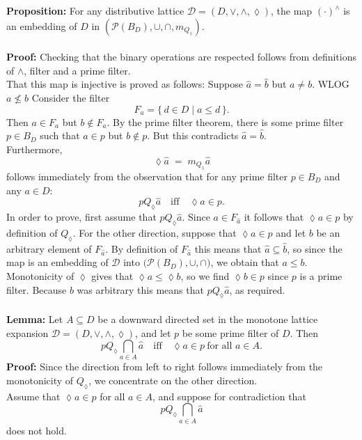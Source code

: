 \documentclass[12pt]{article}
\begin{document}
\textbf{Proposition:} For any distributive lattice $\mathcal{D}=(D, \vee, \wedge, \lozenge)$, the map $(\cdot)^{\wedge}$ is an embedding of $D$ in 
$(\mathcal{P}(B_D), \cup, \cap,m_{Q_{\lozenge}})$. \\ \\
\textbf{Proof:} Checking that the binary operations are respected follows from definitions of $\wedge$, filter and a prime filter. \\
That this map is injective is proved as follows:  
Suppose $\widehat{a} = \widehat{b}$ but $a \neq b$. WLOG $a \nleq b$
Consider the filter 
\[
F_{a} = \{\, d \in D \mid a \leq d \,\}.
\]
Then $a \in F_{a}$ but $b \notin F_{a}$.  
By the prime filter theorem, there is some prime filter $p \in B_{D}$ such that  
$a \in p$ but $b \notin p$.  
But this contradicts $\widehat{a} = \widehat{b}$. \\
Furthermore, 
\[
\lozenge \widehat{a} \;=\; m_{Q_{\lozenge}} \widehat{a}
\]
follows immediately from the observation that for any prime filter $p \in B_{D}$ and any $a \in D$:  
\[
p Q_{\lozenge} \widehat{a} \quad \text{iff} \quad \lozenge a \in p.
\]
In order to prove, first assume that $p Q_{\lozenge} \widehat{a}$.  
Since $a \in F_{\widehat{a}}$ it follows that $\lozenge a \in p$ by definition of $Q_{\lozenge}$. For the other direction, suppose that $\lozenge a \in p$ and let $b$ be an arbitrary element of $F_{\widehat{a}}$.  
By definition of $F_{\widehat{a}}$ this means that $\widehat{a} \subseteq \widehat{b}$,  
so since the map is an embedding of $\mathcal{D}$ into $\bigl( \mathcal{P}(B_{D}), \cup, \cap)$, we obtain that $a \leq b$.  
Monotonicity of $\lozenge$ gives that $\lozenge a \leq \lozenge b$,  
so we find $\lozenge b \in p$ since $p$ is a prime filter.  
Because $b$ was arbitrary this means that $p Q_{\lozenge} \widehat{a}$, as required. \\ \\
\textbf{Lemma:}  
Let $A \subseteq D$ be a downward directed set in the monotone lattice expansion 
$\mathcal{D} = (D, \vee, \wedge, \lozenge)$, and let $p$ be some prime filter of $D$.  
Then
\[
p Q_{\lozenge} \bigcap_{a \in A} \widehat{a} 
\quad \text{iff} \quad 
\lozenge a \in p \ \text{for all } a \in A.
\]
\textbf{Proof:}  
Since the direction from left to right follows immediately from the monotonicity of $Q_{\lozenge}$, 
we concentrate on the other direction.\\
Assume that $\lozenge a \in p$ for all $a \in A$, and suppose for contradiction that 
\[
p Q_{\lozenge} \bigcap_{a \in A} \widehat{a}
\]
does not hold.  
\end{document}
